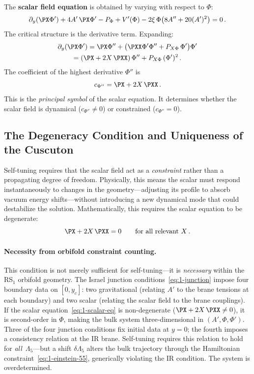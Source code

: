 The \textbf{scalar field equation} is obtained by varying with respect to $\Phi$:
\begin{equation}
\label{eq:1-scalar-eq}
\partial_y(\PX \Phi') + 4A'\, \PX \Phi' - P_\Phi + V'(\Phi) - 2\xi\,\Phi\bigl(8A'' + 20(A')^2\bigr) = 0\,.
\end{equation}
The critical structure is the derivative term. Expanding:
\begin{multline}
\label{eq:1-scalar-expand}
\partial_y(\PX \Phi') = \PX \Phi'' + \bigl(\PXX \Phi'\Phi'' + P_{X\Phi}\,\Phi'\bigr)\Phi' \\
= (\PX + 2X\,\PXX)\,\Phi'' + P_{X\Phi}\,(\Phi')^2\,.
\end{multline}
The coefficient of the highest derivative $\Phi''$ is
\begin{equation}
\label{eq:1-principal}
c_{\Phi''} = \PX + 2X\,\PXX\,.
\end{equation}
This is the \emph{principal symbol} of the scalar equation. It determines whether the scalar field is dynamical ($c_{\Phi''} \neq 0$) or constrained ($c_{\Phi''} = 0$).

\subsection{The Degeneracy Condition and Uniqueness of the Cuscuton}
\label{sec:1-degeneracy}

Self-tuning requires that the scalar field act as a \emph{constraint} rather than a propagating degree of freedom. Physically, this means the scalar must respond instantaneously to changes in the geometry---adjusting its profile to absorb vacuum energy shifts---without introducing a new dynamical mode that could destabilize the solution. Mathematically, this requires the scalar equation to be degenerate:
\begin{equation}
\label{eq:1-degen}
\PX + 2X\,\PXX = 0 \qquad \text{for all relevant } X\,.
\end{equation}

\paragraph{Necessity from orbifold constraint counting.} This condition is not merely sufficient for self-tuning---it is \emph{necessary} within the RS$_1$ orbifold geometry. The Israel junction conditions~\eqref{eq:1-junction} impose four boundary data on $[0, y_c]$: two gravitational (relating $A'$ to the brane tensions at each boundary) and two scalar (relating the scalar field to the brane couplings). If the scalar equation~\eqref{eq:1-scalar-eq} is non-degenerate ($\PX + 2X\,\PXX \neq 0$), it is second-order in $\Phi$, making the bulk system three-dimensional in $(A', \Phi, \Phi')$. Three of the four junction conditions fix initial data at $y = 0$; the fourth imposes a consistency relation at the IR brane. Self-tuning requires this relation to hold for \emph{all}~$\Lambda_5$---but a shift $\delta\Lambda_5$ alters the bulk trajectory through the Hamiltonian constraint~\eqref{eq:1-einstein-55}, generically violating the IR condition. The system is overdetermined.

